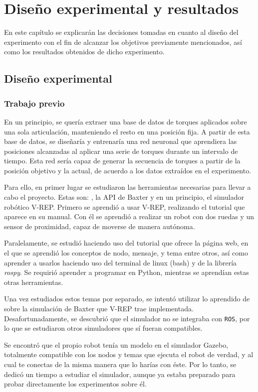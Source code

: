 \chapter{Diseño experimental y resultados}
En este capítulo se explicarán las decisiones tomadas en cuanto al diseño del experimento con el fin de alcanzar los objetivos previamente mencionados, así como los resultados obtenidos de dicho experimento.
\section{Diseño experimental}
\subsection{Trabajo previo}
En un principio, se quería extraer una base de datos de torques aplicados sobre una sola articulación, manteniendo el resto en una posición fija. A partir de esta base de datos, se diseñaría y entrenaría una red neuronal que aprendiera las posiciones alcanzadas al aplicar una serie de torques durante un intervalo de tiempo. Esta red sería capaz de generar la secuencia de torques a partir de la posición objetivo y la actual, de acuerdo a los datos extraídos en el experimento.

Para ello, en primer lugar se estudiaron las herramientas necesarias para llevar a cabo el proyecto. Estas son: \ros, la API de Baxter y en un principio, el simulador robótico V-REP. Primero se aprendió a usar V-REP, realizando el tutorial que aparece en su manual. Con él se aprendió a realizar un robot con dos ruedas y un sensor de proximidad, capaz de moverse de manera autónoma.

Paralelamente, se estudió \ros haciendo uso del tutorial que ofrece la página web, en el que se aprendió los conceptos de nodo, mensaje, y tema entre otros, así como aprender a usarlos haciendo uso del terminal de linux (bash) y de la librería \textit{rospy}. Se requirió aprender a programar en Python, mientras se aprendían estas otras herramientas.

Una vez estudiados estos temas por separado, se intentó utilizar lo aprendido de \ros sobre la simulación de Baxter que V-REP trae implementada. Desafortunadamente, se descubrió que el simulador no se integraba con \texttt{ROS}, por lo que se estudiaron otros simuladores que sí fueran compatibles.

Se encontró que el propio robot tenía un modelo en el simulador Gazebo, totalmente compatible con los nodos y temas que ejecuta el robot de verdad, y al cual te conectas de la misma manera que lo harías con éste. Por lo tanto, se dedicó un tiempo a estudiar el simulador, aunque ya estaba preparado para probar directamente los experimentos sobre él.

